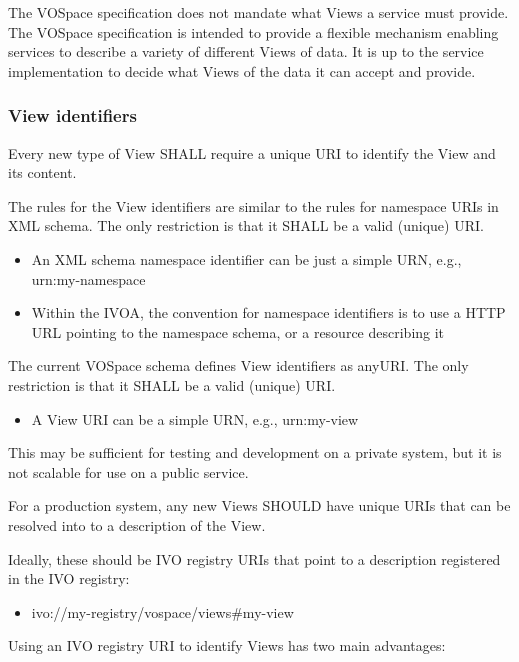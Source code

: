 \documentclass[11pt,a4paper]{ivoa}
\begin{document}
The VOSpace specification does not mandate what Views a service must provide. The VOSpace specification is intended to provide a flexible mechanism enabling services to describe a variety of different Views of data. It is up to the service implementation to decide what Views of the data it can accept and provide.

\subsubsection{View identifiers}
\label{subsubsec:view identifiers}
Every new type of View SHALL require a unique URI to identify the View and its content.

The rules for the View identifiers are similar to the rules for namespace URIs in XML schema. The only restriction is that it SHALL be a valid (unique) URI.

\begin{itemize}
    \item An XML schema namespace identifier can be just a simple URN, e.g., urn:my-namespace
    \item Within the IVOA, the convention for namespace identifiers is to use a HTTP URL pointing to the namespace schema, or a resource describing it
\end{itemize}

The current VOSpace schema defines View identifiers as anyURI. The only restriction is that it SHALL be a valid (unique) URI.

\begin{itemize}
    \item A View URI can be a simple URN, e.g., urn:my-view
\end{itemize}

This may be sufficient for testing and development on a private system, but it is not scalable for use on a public service.

For a production system, any new Views SHOULD have unique URIs that can be resolved into to a description of the View.

Ideally, these should be IVO registry URIs that point to a description registered in the IVO registry:

\begin{itemize}
    \item ivo://my-registry/vospace/views\#my-view
\end{itemize}

Using an IVO registry URI to identify Views has two main advantages:
\end{document}
